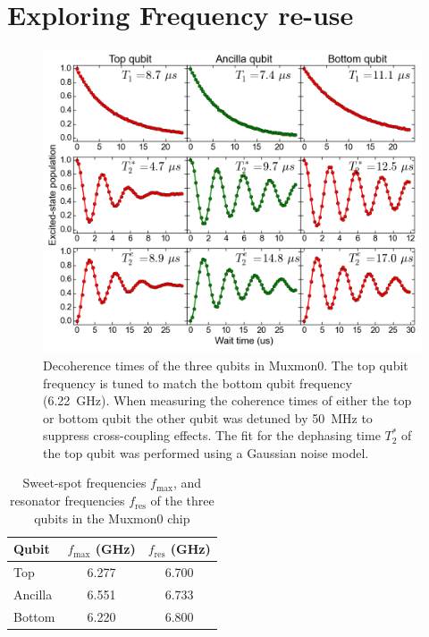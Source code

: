     \section{Exploring Frequency re-use}
      \label{sec:Exploring Frequency re-use}
      \begin{figure}[tb]
        \centering
        \includegraphics[width=\linewidth]{../Figures/Exploring frequency re-use/coherence_times.png}
        \caption{Decoherence times of the three qubits in Muxmon0. The top qubit frequency is tuned to match the bottom qubit frequency (\SI{6.22}{\giga \hertz}). When measuring the coherence times of either the top or bottom qubit the other qubit was detuned by \SI{50}{\mega \hertz} to suppress cross-coupling effects. The fit for the dephasing time $T_2^*$ of the top qubit was performed using a Gaussian noise model.}
        \label{fig:decoherence times Muxmon0}
      \end{figure}

      \begin{table}
        \begin{tabular}{l c c}
          \toprule
          Qubit  & $f_\text{max}$ (GHz) & $f_\text{res}$ (GHz)\\
          \midrule
          Top    & 6.277                & 6.700 \\
          Ancilla& 6.551                & 6.733 \\
          Bottom & 6.220                & 6.800 \\
          \bottomrule
        \end{tabular}
        \caption{Sweet-spot frequencies $f_\text{max}$, and resonator frequencies $f_\text{res}$ of the three qubits in the Muxmon0 chip}
        \label{tab:Muxmon0 qubit properties}
      \end{table}

